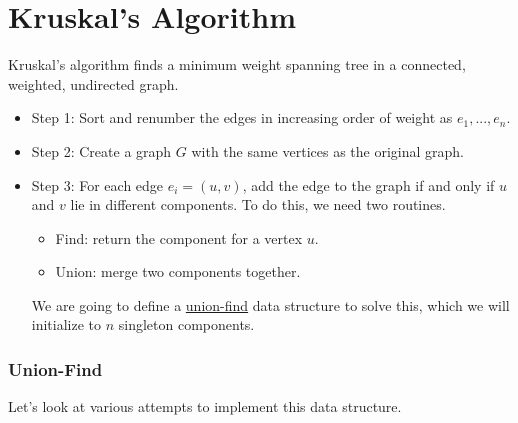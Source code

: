 
\section{Kruskal's Algorithm}


Kruskal's algorithm finds a minimum weight spanning tree in a 
connected, weighted, undirected graph. 

\begin{itemize}
    \item Step 1: Sort and renumber the edges in increasing
order of weight as $e_1, ..., e_n$. 
    \item Step 2: Create a graph $G$ with the same vertices as the
    original
    graph.
    \item Step 3: For each edge $e_i = (u, v)$, add the edge
    to the graph if and only if $u$ and $v$ lie in different
    components. To do this, we need two routines.
    \begin{itemize}
        \item Find: return the component for a vertex $u$.
        \item Union: merge two components together.
    \end{itemize}
    We are going to define a \href{https://en.wikipedia.org/wiki/Disjoint-set_data_structure}{union-find} data structure to
    solve this, which we will initialize to $n$ singleton components.
\end{itemize}

\subsubsection{Union-Find}

Let's look at various attempts to implement this data structure.

